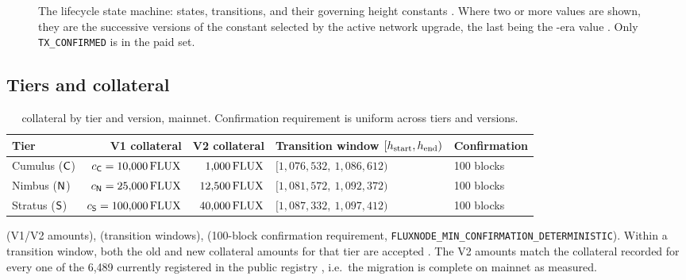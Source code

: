 \begin{figure}[H]
\caption{The \FluxNode lifecycle state machine: states, transitions, and their governing height
constants \shipped {}. Where two or more values are
shown, they are the successive versions of the constant selected by the active network upgrade, the
last being the \PoN-era value . Only
\texttt{TX\_CONFIRMED} is in the paid set.}
\label{fig:fluxnode-lifecycle}
\end{figure}

\subsection{Tiers and collateral}
\label{sec:consensus-tiers}

\begin{table}[H]
\centering
\caption{\FluxNode collateral by tier and version, mainnet. Confirmation requirement is uniform across
tiers and versions.}
\label{tab:tiers}
\begin{tabular}{lrrll}
\toprule
Tier & V1 collateral & V2 collateral & Transition window $[h_{\mathrm{start}},h_{\mathrm{end}})$ & Confirmation \\
\midrule
Cumulus ($\mathsf{C}$) & $c_{\mathsf{C}}=10{,}000\,\mathrm{FLUX}$ & $1{,}000\,\mathrm{FLUX}$ & $[1{,}076{,}532,\ 1{,}086{,}612)$ & 100 blocks \\
Nimbus ($\mathsf{N}$)  & $c_{\mathsf{N}}=25{,}000\,\mathrm{FLUX}$ & $12{,}500\,\mathrm{FLUX}$ & $[1{,}081{,}572,\ 1{,}092{,}372)$ & 100 blocks \\
Stratus ($\mathsf{S}$) & $c_{\mathsf{S}}=100{,}000\,\mathrm{FLUX}$ & $40{,}000\,\mathrm{FLUX}$ & $[1{,}087{,}332,\ 1{,}097{,}412)$ & 100 blocks \\
\bottomrule
\end{tabular}
\end{table}
\shipped {} (V1/V2 amounts),
 (transition windows),
 (100-block confirmation requirement,
\texttt{FLUXNODE\_MIN\_CONFIRMATION\_DETERMINISTIC}). Within a transition window, both the old and new
collateral amounts for that tier are accepted \shipped {}. The V2
amounts match the collateral recorded for every one of the 6{,}489 currently registered \FluxNodes in
the public registry , i.e.\ the
migration is complete on mainnet as measured.

